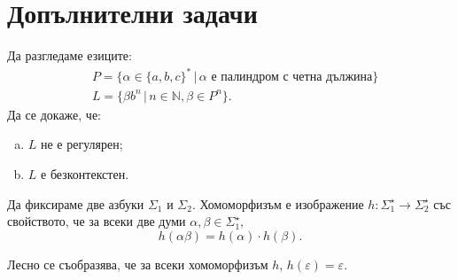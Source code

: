 \section{Допълнителни задачи}

\begin{problem}
  Да разгледаме езиците:
  \begin{align*}
    & P = \{\alpha\in\{a,b,c\}^*\,|\, \alpha \text{ е палиндром с четна дължина}\} \\
    & L =  \{\beta b^n\,|\, n\in\mathbb{N}, \beta\in P^n\}.
  \end{align*}
  Да се докаже, че:
  \begin{enumerate}[a)]
  \item 
    $L$ не е регулярен;
  \item 
    $L$ е безконтекстен.
  \end{enumerate}
\end{problem}


\begin{dfn}
  Да фиксираме две азбуки $\Sigma_1$ и $\Sigma_2$.
  Хомоморфизъм е изображение $h:\Sigma^\star_1 \to \Sigma^\star_2$ със свойството, че
  за всеки две думи $\alpha,\beta\in\Sigma^\star_1$,
  \[h(\alpha\beta) = h(\alpha)\cdot h(\beta).\]
\end{dfn}

Лесно се съобразява, че за всеки хомоморфизъм $h$, $h(\varepsilon) = \varepsilon$.

